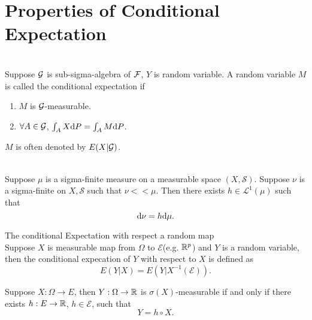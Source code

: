 \section{Properties of Conditional Expectation}

\begin{Definition} \ \\
Suppose $\mathcal{G}$ is sub-sigma-algebra of $\mathcal{F}$, $Y$ is random variable. A random variable $M$ is called the conditional expectation if 
\begin{enumerate}
	\item $M$ is $\mathcal{G}$-measurable.
	\item $\forall A \in \mathcal{G}$, $\int_A X \mathrm{d} P = \int_A M \mathrm{d} P$.  
\end{enumerate}
\end{Definition}

$M$ is often denoted by $E(X|\mathcal{G})$.


\begin{Theorem} \ \\
Suppose $\mu$ is a sigma-finite measure on a measurable space $(X,\mathcal{S})$. Suppose $\nu$ is a sigma-finite on $X, \mathcal{S}$ such that $\nu << \mu$. Then there exists $h \in \mathcal{L}^{1}(\mu)$ such that
$$
\mathrm{d} \nu = h \mathrm{d} \mu.
$$
\end{Theorem}

\begin{Definition}{The conditional Expectation with respect a random map} \ \\
Suppose $X$ is measurable map from $\Omega$ to $\mathcal{E}$(e.g. $\mathbb{R}^p$) and $Y$ is a random variable, then the conditional expecation of $Y$ with respect to $X$ is defined as 
$$
E(Y|X) = E(Y| X^{-1}(\mathcal{E})).
$$
\end{Definition}


\begin{Theorem}\label{thm:ExistenceOfFunc}
Suppose $X: \Omega \to E$, then $Y: \Omega \to \mathbb{R}$ is $\sigma(X)$-measurable if and only if there exists $h: E \to \mathbb{R}$, $h \in \mathcal{E}$, such that 
$$
Y = h \circ X.
$$
\end{Theorem}



